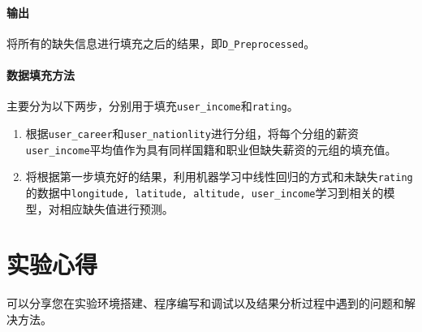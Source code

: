 \documentclass{ML}
\begin{document}
\paragraph{输出} 将所有的缺失信息进行填充之后的结果，即\texttt{D\_Preprocessed}。
\paragraph{数据填充方法} 主要分为以下两步，分别用于填充\texttt{user\_income}和\texttt{rating}。
\begin{enumerate}
    \item 根据\texttt{user\_career}和\texttt{user\_nationlity}进行分组，将每个分组的薪资\texttt{user\_income}平均值作为具有同样国籍和职业但缺失薪资的元组的填充值。
    \item 将根据第一步填充好的结果，利用机器学习中线性回归的方式和未缺失\texttt{rating}的数据中\texttt{longitude, latitude, altitude, user\_income}学习到相关的模型，对相应缺失值进行预测。
\end{enumerate}
\section{实验心得}
可以分享您在实验环境搭建、程序编写和调试以及结果分析过程中遇到的问题和解决方法。

\end{document}
